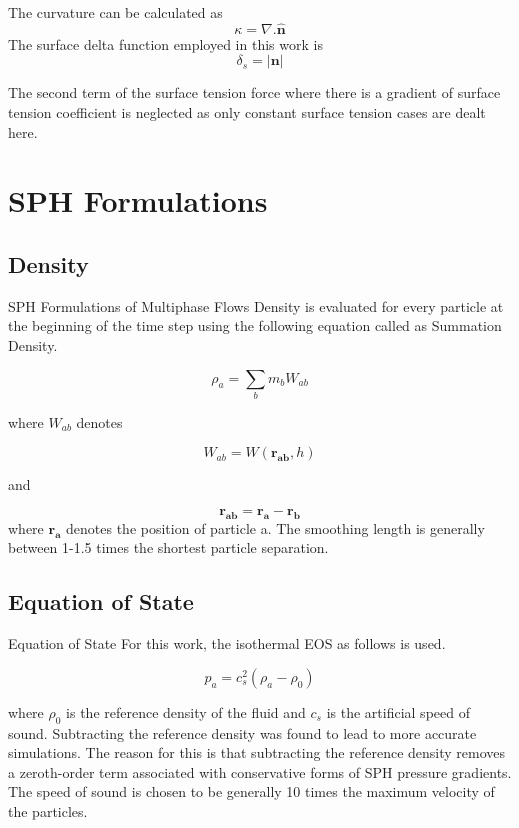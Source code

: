 \documentclass{beamer}
\begin{document}
\begin{frame}
The curvature can be calculated as
\begin{equation*}
 \kappa = \nabla . \mathbf{\hat{n}}
\end{equation*}
\noindent
The surface delta function employed in this work is
\begin{equation*}
 \delta_s = \left| \mathbf{n} \right |
\end{equation*}

The second term of the surface tension force where there is a gradient of surface tension coefficient is neglected as only constant surface tension cases are dealt here.
\end{frame}

\section{SPH Formulations}
\subsection{Density}
\begin{frame}{SPH Formulations of Multiphase Flows}
Density is evaluated for every particle at the beginning of the time step using the following equation called as Summation Density. 

\begin{equation*}
 \rho_a = \sum_b m_b W_{ab}
\end{equation*}

\noindent
where $W_{ab}$ denotes

\begin{equation*}
 W_{ab} = W(\mathbf{r_{ab}}, h)
\end{equation*}

\noindent
and

\begin{equation*}
 \mathbf{r_{ab}} = \mathbf{r_a} - \mathbf{r_b}
\end{equation*}
\noindent
where $\mathbf{r_a}$ denotes the position of particle a.
The smoothing length is generally between 1-1.5 times the shortest particle separation. 
\end{frame}

\subsection{Equation of State}
\begin{frame}{Equation of State}
\justifying
For this work, the isothermal EOS as follows is used.

\begin{equation*}
 p_a = c_s^2 (\rho_a - \rho_0)
\end{equation*}

\noindent
where $\rho_0$ is the reference density of the fluid and $c_s$ is the artificial speed of sound. 
Subtracting the reference density was found to lead to more accurate simulations. 
The reason for this is that subtracting the reference density removes a zeroth-order term associated with conservative forms of SPH pressure gradients. 
The speed of sound is chosen to be generally 10 times the maximum velocity of the particles.
\end{frame}
\end{document}
